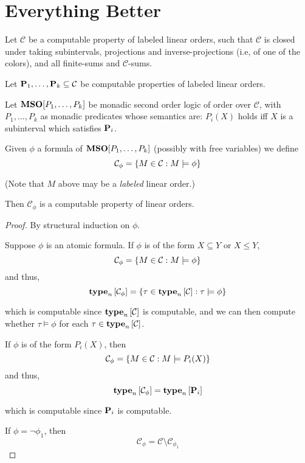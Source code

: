 \section{Everything Better}

\begin{theorem}
    Let $\mathcal{C}$ be a computable property of labeled linear orders,
    such that $\mathcal{C}$ is closed under taking subintervals,
    projections and inverse-projections (i.e, of one of the colors), and all finite-sums and $\mathcal{C}$-sums.

    Let $\mathbf{P}_1, \ldots, \mathbf{P}_k \subseteq \mathcal{C}$ be
    computable properties of labeled linear orders.

    Let $\mathbf{MSO}[P_1, \ldots, P_k]$ be monadic second order logic of order
    over $\mathcal{C}$,
    with $P_1, \ldots, P_k$ as monadic predicates whose semantics are:
    $P_i(X)$ holds iff $X$ is a subinterval which satisfies $\mathbf{P}_i$.

    Given $\phi$ a formula of $\mathbf{MSO}[P_1, \ldots, P_k]$ (possibly with free variables)
    we define \[ \mathcal{C}_{\phi} = \left\{ {M \in \mathcal{C} : M \models \phi} \right\} \]

    (Note that $M$ above may be a \emph{labeled} linear order.)

    Then $\mathcal{C}_{\phi}$ is a computable property of linear orders.
\end{theorem}

\begin{proof}
    By structural induction on $\phi$.

    Suppose $\phi$ is an atomic formula.
    If $\phi$ is of the form $X \subseteq Y$ or $X \le Y$,
    \[
        \mathcal{C}_{\phi} = \left\{ {M \in \mathcal{C} : M \models \phi} \right\}
    \]
    and thus,
    \[
        \mathbf{type}_{n} \left[ {\mathcal{C}_{\phi}} \right] = \left\{ {\tau \in \mathbf{type}_{n} \left[ {\mathcal{C}} \right] : \tau \models \phi} \right\}
    \]

    which is computable since $\mathbf{type}_{n} \left[ {\mathcal{C}} \right]$ is computable,
    and we can then compute whether $\tau \models \phi$ for each $\tau \in \mathbf{type}_{n} \left[ {\mathcal{C}} \right]$.

    If $\phi$ is of the form $P_i(X)$,
    then
    \[
        \mathcal{C}_{\phi} = \left\{ {M \in \mathcal{C} : M \models P_i(X)} \right\}
    \]
    and thus,
    \[
        \mathbf{type}_{n} \left[ {\mathcal{C}_{\phi}} \right] = \mathbf{type}_{n} \left[ {\mathbf{P}_i} \right]
    \]

    which is computable since $\mathbf{P}_i$ is computable.

    If $\phi = \neg \phi_1$,
    then
    \[
        \mathcal{C}_{\phi} = \mathcal{C} \setminus \mathcal{C}_{\phi_1}
    \]

\end{proof}